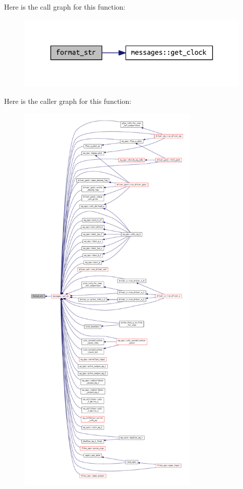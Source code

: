 Here is the call graph for this function\+:
\nopagebreak
\begin{figure}[H]
\begin{center}
\leavevmode
\includegraphics[width=324pt]{messages_8f90_a6d15f28783f95a7a4b2a44185619792f_cgraph}
\end{center}
\end{figure}
Here is the caller graph for this function\+:
\nopagebreak
\begin{figure}[H]
\begin{center}
\leavevmode
\includegraphics[height=550pt]{messages_8f90_a6d15f28783f95a7a4b2a44185619792f_icgraph}
\end{center}
\end{figure}
